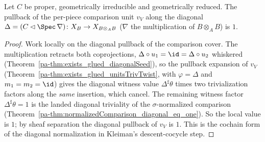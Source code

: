 \begin{theorem}
  \label{pa-thm:pieceComparisonUnit_diagonal_eq_one}
  \leanok

  Let \(C\) be proper, geometrically irreducible and geometrically reduced. The pullback of the
  per-piece comparison unit \(v_V\) along the diagonal \(\Delta = (C \lhd \Spec\, \nabla) \colon X_B
  \to X_{B \otimes_A B}\) (\(\nabla\) the multiplication of \(B \otimes_A B\)) is \(1\).
\end{theorem}
\begin{proof}
  \leanok
  Work locally on the diagonal pullback of the comparison cover. The multiplication retracts both
  coprojections, \(\Delta \circ u_1 = \id = \Delta \circ u_2\) whiskered
  (Theorem~\ref{pa-thm:exists_glued_diagonalSeed}), so the pullback expansion of \(v_V\)
  (Theorem~\ref{pa-thm:exists_glued_unitsTrivTwist}, with \(\varphi = \Delta\) and \(m_1 = m_2 = \id\))
  gives the diagonal witness value \(\Delta^{\sharp}\theta\) times two trivialization factors along
  the \emph{same} insertion, which cancel. The remaining witness factor \(\Delta^{\sharp}\theta = 1\)
  is the landed diagonal triviality of the \(\sigma\)-normalized comparison
  (Theorem~\ref{pa-thm:normalizedComparison_diagonal_eq_one}). So the local value is \(1\); by sheaf
  separation the diagonal pullback of \(v_V\) is \(1\). This is the cochain form of the diagonal
  normalization in Kleiman's descent-cocycle step.
\end{proof}

